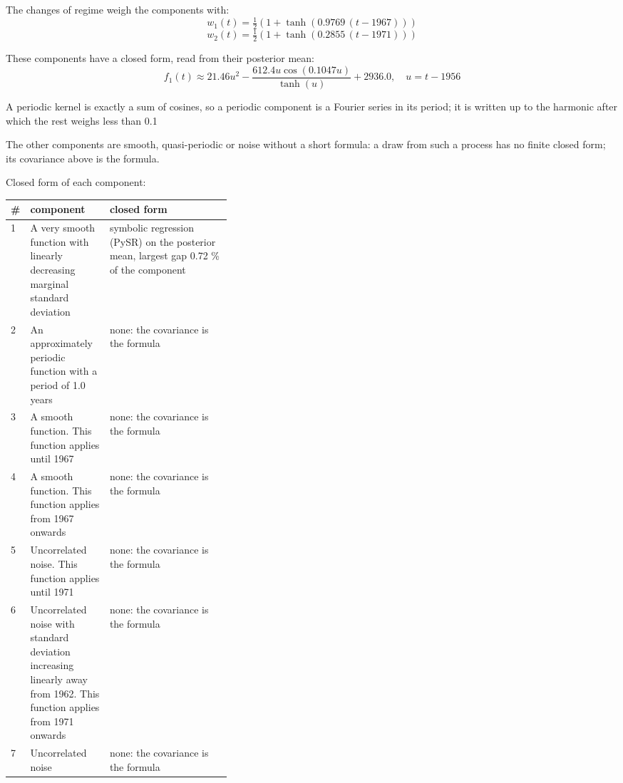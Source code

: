 \documentclass[11pt,a4paper]{article}
\begin{document}
The changes of regime weigh the components with:
\begin{dmath*}
w_{1}(t) = \tfrac{1}{2}\left(1 + \tanh\left(0.9769\,(t - 1967)\right)\right)
\end{dmath*}
\begin{dmath*}
w_{2}(t) = \tfrac{1}{2}\left(1 + \tanh\left(0.2855\,(t - 1971)\right)\right)
\end{dmath*}

These components have a closed form, read from their posterior mean:
\begin{dmath*}
f_{1}(t) \approx 21.46 u^{2} - \frac{612.4 u \cos{\left(0.1047 u \right)}}{\tanh{\left(u \right)}} + 2936.0,\quad u = t - 1956
\end{dmath*}

A periodic kernel is exactly a sum of cosines, so a periodic component is a Fourier series in its period; it is written up to the harmonic after which the rest weighs less than 0.1 %

The other components are smooth, quasi-periodic or noise without a short formula: a draw from such a process has no finite closed form; its covariance above is the formula.

Closed form of each component:

\begin{center}\footnotesize
\begin{tabular}{lp{0.36\linewidth}l}
\toprule
\# & component & closed form \\
\midrule
1 & A very smooth function with linearly decreasing marginal standard deviation & symbolic regression (PySR) on the posterior mean, largest gap 0.72 \% of the component \\
2 & An approximately periodic function with a period of 1.0 years & none: the covariance is the formula \\
3 & A smooth function. This function applies until 1967 & none: the covariance is the formula \\
4 & A smooth function. This function applies from 1967 onwards & none: the covariance is the formula \\
5 & Uncorrelated noise. This function applies until 1971 & none: the covariance is the formula \\
6 & Uncorrelated noise with standard deviation increasing linearly away from 1962. This function applies from 1971 onwards & none: the covariance is the formula \\
7 & Uncorrelated noise & none: the covariance is the formula \\
\bottomrule
\end{tabular}
\end{center}
\end{document}
